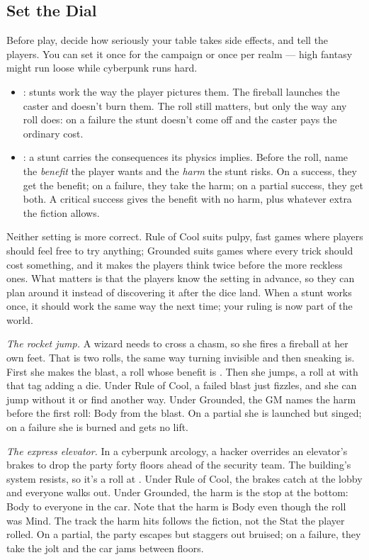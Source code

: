 \subsection*{Set the Dial}
Before play, decide how seriously your table takes side effects, and
tell the players. You can set it once for the campaign or once per realm
--- high fantasy might run loose while cyberpunk runs hard.
\begin{itemize}
  \item {}: stunts work the way the player pictures
    them. The fireball launches the caster and doesn't burn them. The
    roll still matters, but only the way any roll does: on a failure the
    stunt doesn't come off and the caster pays the ordinary cost.
  \item {}: a stunt carries the consequences its physics
    implies. Before the roll, name the \emph{benefit} the player wants
    and the \emph{harm} the stunt risks. On a success, they get the
    benefit; on a failure, they take the harm; on a partial success,
    they get both. A critical success gives the benefit with no harm,
    plus whatever extra the fiction allows.
\end{itemize}
Neither setting is more correct. Rule of Cool suits pulpy, fast games
where players should feel free to try anything; Grounded suits games
where every trick should cost something, and it makes the players think
twice before the more reckless ones. What matters is that the players
know the setting in advance, so they can plan around it instead of
discovering it after the dice land. When a stunt works once, it should
work the same way the next time; your ruling is now part of the world.

\begin{example}
\emph{The rocket jump.} A wizard needs to cross a chasm, so she fires a
fireball at her own feet. That is two rolls, the same way turning
invisible and then sneaking is. First she makes the blast, a
 roll whose benefit is . Then
she jumps, a  roll at  with that tag adding a die.
Under Rule of Cool, a failed blast just fizzles, and she can jump
without it or find another way. Under Grounded, the GM names the harm
before the first roll:  Body from the blast. On a partial she
is launched but singed; on a failure she is burned and gets no lift.
\end{example}

\begin{example}
\emph{The express elevator.} In a cyberpunk arcology, a hacker overrides
an elevator's brakes to drop the party forty floors ahead of the
security team. The building's system resists, so it's a 
roll at . Under Rule of Cool, the brakes catch at the lobby and
everyone walks out. Under Grounded, the harm is the stop at the
bottom:  Body to everyone in the car. Note that the harm is
Body even though the roll was Mind. The track the harm hits follows the
fiction, not the Stat the player rolled. On a partial, the party escapes
but staggers out bruised; on a failure, they take the jolt and the car
jams between floors.
\end{example}


